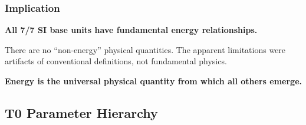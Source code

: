 	\begin{table}[htbp]
		\centering
		\caption{Complete T0 model energy coverage of all 7 SI base units}
		\label{tab:complete_t0_si_coverage}
	\end{table}
	
	\subsubsection{Implication}
	\label{subsubsec:revolutionary_implication}
	
	\begin{tcolorbox}[colback=green!5!white,colframe=green!75!black,title=T0 Model: Universal Energy Principle Confirmed]
		\textbf{All 7/7 SI base units have fundamental energy relationships.}
		
		There are no ``non-energy'' physical quantities. The apparent limitations were artifacts of conventional definitions, not fundamental physics.
		
		\textbf{Energy is the universal physical quantity from which all others emerge.}
	\end{tcolorbox}
	
	\subsection{T0 Parameter Hierarchy}
	\label{subsec:t0_parameter_hierarchy}
	
